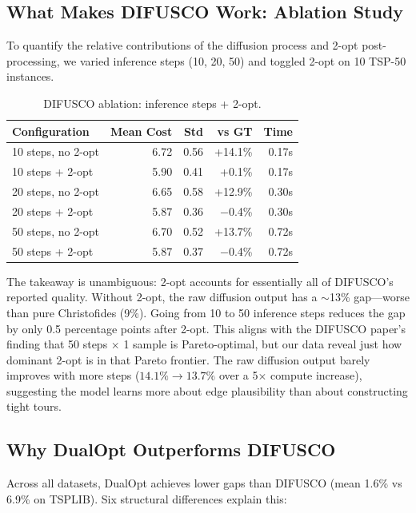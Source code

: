 \documentclass[11pt,a4paper]{article}
\begin{document}
\subsection{What Makes DIFUSCO Work: Ablation Study}

To quantify the relative contributions of the diffusion process and 2-opt post-processing, we varied inference steps (10, 20, 50) and toggled 2-opt on 10 TSP-50 instances.

\begin{table}[H]
\centering
\footnotesize
\caption{DIFUSCO ablation: inference steps + 2-opt.}
\begin{tabular}{@{}lrrrr@{}}
\toprule
Configuration & Mean Cost & Std & vs GT & Time \\
\midrule
10 steps, no 2-opt & 6.72 & 0.56 & +14.1\% & 0.17s \\
10 steps + 2-opt & 5.90 & 0.41 & +0.1\% & 0.17s \\
20 steps, no 2-opt & 6.65 & 0.58 & +12.9\% & 0.30s \\
20 steps + 2-opt & 5.87 & 0.36 & $-$0.4\% & 0.30s \\
50 steps, no 2-opt & 6.70 & 0.52 & +13.7\% & 0.72s \\
50 steps + 2-opt & 5.87 & 0.37 & $-$0.4\% & 0.72s \\
\bottomrule
\end{tabular}
\end{table}

The takeaway is unambiguous: 2-opt accounts for essentially all of DIFUSCO's reported quality. Without 2-opt, the raw diffusion output has a $\sim$13\% gap---worse than pure Christofides (9\%). Going from 10 to 50 inference steps reduces the gap by only 0.5 percentage points after 2-opt. This aligns with the DIFUSCO paper's finding that 50 steps $\times$ 1 sample is Pareto-optimal, but our data reveal just how dominant 2-opt is in that Pareto frontier. The raw diffusion output barely improves with more steps ($14.1\% \rightarrow 13.7\%$ over a 5$\times$ compute increase), suggesting the model learns more about edge plausibility than about constructing tight tours.

\subsection{Why DualOpt Outperforms DIFUSCO}

Across all datasets, DualOpt achieves lower gaps than DIFUSCO (mean 1.6\% vs 6.9\% on TSPLIB). Six structural differences explain this:
\end{document}
